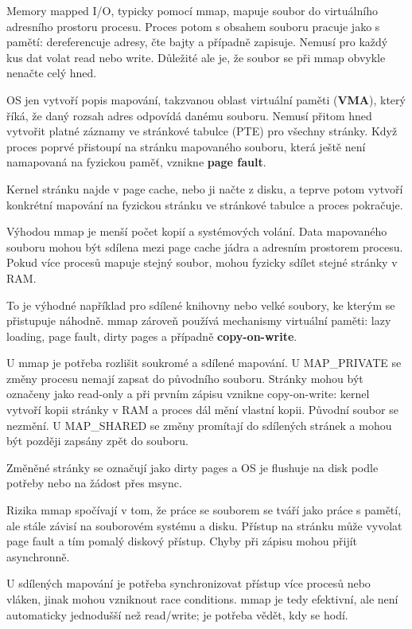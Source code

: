 Memory mapped I/O, typicky pomocí mmap, mapuje soubor do virtuálního adresního prostoru procesu. Proces potom s obsahem souboru pracuje jako s pamětí: dereferencuje adresy, čte bajty a případně zapisuje. Nemusí pro každý kus dat volat read nebo write. Důležité ale je, že soubor se při mmap obvykle nenačte celý hned.

OS jen vytvoří popis mapování, takzvanou oblast virtuální paměti (\textbf{VMA}), který říká, že daný rozsah adres odpovídá danému souboru. Nemusí přitom hned vytvořit platné záznamy ve stránkové tabulce (PTE) pro všechny stránky. Když proces poprvé přistoupí na stránku mapovaného souboru, která ještě není namapovaná na fyzickou paměť, vznikne \textbf{page fault}.

Kernel stránku najde v page cache, nebo ji načte z disku, a teprve potom vytvoří konkrétní mapování na fyzickou stránku ve stránkové tabulce a proces pokračuje.

Výhodou mmap je menší počet kopií a systémových volání. Data mapovaného souboru mohou být sdílena mezi page cache jádra a adresním prostorem procesu. Pokud více procesů mapuje stejný soubor, mohou fyzicky sdílet stejné stránky v RAM.

To je výhodné například pro sdílené knihovny nebo velké soubory, ke kterým se přistupuje náhodně. mmap zároveň používá mechanismy virtuální paměti: lazy loading, page fault, dirty pages a případně \textbf{copy-on-write}.

U mmap je potřeba rozlišit soukromé a sdílené mapování. U MAP\_PRIVATE se změny procesu nemají zapsat do původního souboru. Stránky mohou být označeny jako read-only a při prvním zápisu vznikne copy-on-write: kernel vytvoří kopii stránky v RAM a proces dál mění vlastní kopii. Původní soubor se nezmění. U MAP\_SHARED se změny promítají do sdílených stránek a mohou být později zapsány zpět do souboru.

Změněné stránky se označují jako dirty pages a OS je flushuje na disk podle potřeby nebo na žádost přes msync.

Rizika mmap spočívají v tom, že práce se souborem se tváří jako práce s pamětí, ale stále závisí na souborovém systému a disku. Přístup na stránku může vyvolat page fault a tím pomalý diskový přístup. Chyby při zápisu mohou přijít asynchronně.

U sdílených mapování je potřeba synchronizovat přístup více procesů nebo vláken, jinak mohou vzniknout race conditions. mmap je tedy efektivní, ale není automaticky jednodušší než read/write; je potřeba vědět, kdy se hodí.

